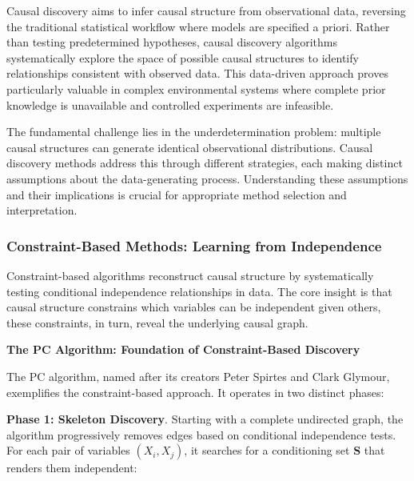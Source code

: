 Causal discovery aims to infer causal structure from observational data, reversing the traditional statistical workflow where models are specified a priori. Rather than testing predetermined hypotheses, causal discovery algorithms systematically explore the space of possible causal structures to identify relationships consistent with observed data. This data-driven approach proves particularly valuable in complex environmental systems where complete prior knowledge is unavailable and controlled experiments are infeasible.

The fundamental challenge lies in the underdetermination problem: multiple causal structures can generate identical observational distributions. Causal discovery methods address this through different strategies, each making distinct assumptions about the data-generating process. Understanding these assumptions and their implications is crucial for appropriate method selection and interpretation.

\subsubsection{Constraint-Based Methods: Learning from Independence}

Constraint-based algorithms reconstruct causal structure by systematically testing conditional independence relationships in data. The core insight is that causal structure constrains which variables can be independent given others, these constraints, in turn, reveal the underlying causal graph.

\textbf{The PC Algorithm: Foundation of Constraint-Based Discovery}

The PC algorithm, named after its creators Peter Spirtes and Clark Glymour, exemplifies the constraint-based approach. It operates in two distinct phases:

\textbf{Phase 1: Skeleton Discovery}. Starting with a complete undirected graph, the algorithm progressively removes edges based on conditional independence tests. For each pair of variables $(X_i, X_j)$, it searches for a conditioning set $\mathbf{S}$ that renders them independent:

